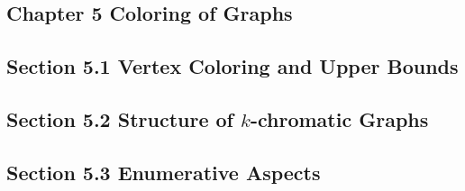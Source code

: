 \documentclass[12pt]{article}
\theoremstyle{definition}
\begin{document}
\subsection*{Chapter 5 Coloring of Graphs}
\subsection*{Section 5.1 Vertex Coloring and Upper Bounds}
\subsection*{Section 5.2 Structure of \(k\)-chromatic Graphs}
\subsection*{Section 5.3 Enumerative Aspects}
\end{document}
